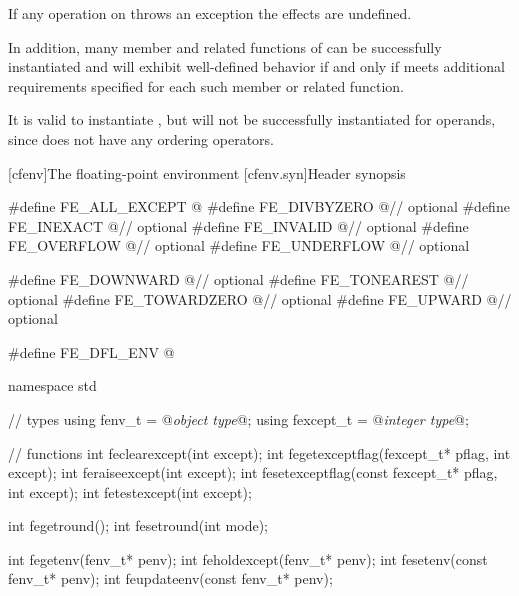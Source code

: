 \pnum
If any operation on 
throws an exception the effects are undefined.

\pnum
In addition, many member and related functions of
can be successfully instantiated
and will exhibit well-defined behavior if and only if
 meets additional requirements specified for each such member
or related function.

\pnum
\begin{example}
It is valid to instantiate
,
but
will not be successfully instantiated for
operands, since
does not have any ordering operators.
\end{example}

[cfenv]{The floating-point environment}
[cfenv.syn]{Header  synopsis}

%
%
%
%
%
%
%
%
%
%
%
%
%
%
%
%
%
%
%
%
%
%
%
%
%
\begin{codeblock}
#define FE_ALL_EXCEPT @\seebelow@
#define FE_DIVBYZERO @\seebelow@    // optional
#define FE_INEXACT @\seebelow@      // optional
#define FE_INVALID @\seebelow@      // optional
#define FE_OVERFLOW @\seebelow@     // optional
#define FE_UNDERFLOW @\seebelow@    // optional

#define FE_DOWNWARD @\seebelow@     // optional
#define FE_TONEAREST @\seebelow@    // optional
#define FE_TOWARDZERO @\seebelow@   // optional
#define FE_UPWARD @\seebelow@       // optional

#define FE_DFL_ENV @\seebelow@

namespace std {
  // types
  using fenv_t    = @\textit{object type}@;
  using fexcept_t = @\textit{integer type}@;

  // functions
  int feclearexcept(int except);
  int fegetexceptflag(fexcept_t* pflag, int except);
  int feraiseexcept(int except);
  int fesetexceptflag(const fexcept_t* pflag, int except);
  int fetestexcept(int except);

  int fegetround();
  int fesetround(int mode);

  int fegetenv(fenv_t* penv);
  int feholdexcept(fenv_t* penv);
  int fesetenv(const fenv_t* penv);
  int feupdateenv(const fenv_t* penv);
}
\end{codeblock}

